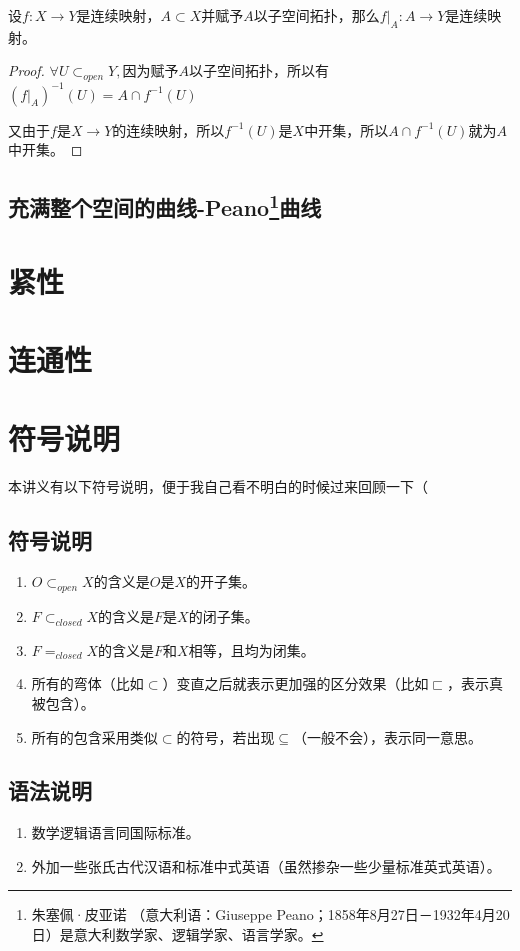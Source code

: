 \documentclass[lang=cn,10pt,device=pad]{elegantbook}
\begin{document}
\begin{proposition}[连续映射之限制是连续映射]
	设$f:X\longrightarrow Y$是连续映射，$A\subset X$并赋予$A$以子空间拓扑，那么$f|_{A}:A\longrightarrow Y$是连续映射。
\end{proposition}
\begin{proof}
	$\forall U\subset_{open} Y, $因为赋予$A$以子空间拓扑，所以有$(f|_{A})^{-1}(U) = A\cap f^{-1}(U)$
	
	又由于$f$是$X\longrightarrow Y$的连续映射，所以$f^{-1}(U)$是$X$中开集，所以$A\cap f^{-1}(U)$就为$A$中开集。
\end{proof}

\section{充满整个空间的曲线-Peano\footnote{朱塞佩·皮亚诺 （意大利语：Giuseppe Peano；1858年8月27日－1932年4月20日）是意大利数学家、逻辑学家、语言学家。}曲线}
\chapter{紧性}
\chapter{连通性}
\chapter{符号说明}
%	

本讲义有以下符号说明，便于我自己看不明白的时候过来回顾一下（
\section{符号说明}
\begin{enumerate}
	\item $O\subset_{open}X$的含义是$O$是$X$的开子集。
	\item $F\subset_{closed}X$的含义是$F$是$X$的闭子集。
	\item $F=_{closed}X$的含义是$F$和$X$相等，且均为闭集。
	\item 所有的弯体（比如$\subset$）变直之后就表示更加强的区分效果（比如$\sqsubset$，表示真被包含）。
	\item 所有的包含采用类似$\subset$的符号，若出现$\subseteq$（一般不会），表示同一意思。
\end{enumerate}
\section{语法说明}
\begin{enumerate}
	\item 数学逻辑语言同国际标准。
	\item 外加一些张氏古代汉语和标准中式英语（虽然掺杂一些少量标准英式英语）。
\end{enumerate}
\end{document}
